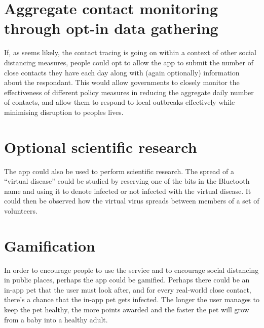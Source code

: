 \documentclass{article}
\begin{document}
\section{Aggregate contact monitoring through opt-in data gathering}

If, as seems likely, the contact tracing is going on within a context of other social distancing measures, people could opt to allow the app to submit the number of close contacts they have each day along with (again optionally) information about the respondant. This would allow governments to closely monitor the effectiveness of different policy measures in reducing the aggregate daily number of contacts, and allow them to respond to local outbreaks effectively while minimising disruption to peoples lives.

\section{Optional scientific research}

The app could also be used to perform scientific research. The spread of a ``virtual disease'' could be studied by reserving one of the bits in the Bluetooth name and using it to denote infected or not infected with the virtual disease. It could then be observed how the virtual virus spreads between members of a set of volunteers.

\section{Gamification}

In order to encourage people to use the service and to encourage social distancing in public places, perhaps the app could be gamified. Perhaps there could be an in-app pet that the user must look after, and for every real-world close contact, there's a chance that the in-app pet gets infected. The longer the user manages to keep the pet healthy, the more points awarded and the faster the pet will grow from a baby into a healthy adult.


%
% 


\end{document}
